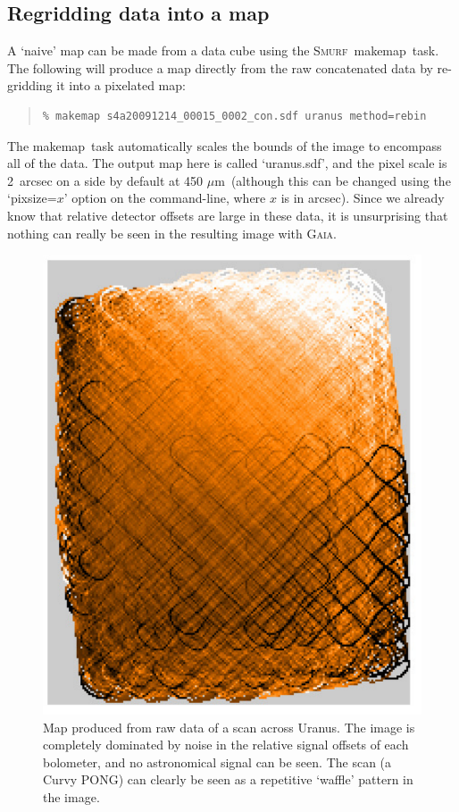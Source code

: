 \documentclass[twoside,11pt]{article}
\newcommand{\micron}{\mbox{\,${\mu}$m}}            %
\newcommand{\xref}[3]{#1}
\newcommand{\xlabel}[1]{}
\renewcommand{\_}{\texttt{\symbol{95}}}
\newenvironment{myquote}{\begin{quote}\begin{small}}{\end{small}\end{quote}}
\newcommand{\gaia}{\xref{\textsc{Gaia}}{sun214}{}}
\newcommand{\smurf}{\xref{\textsc{Smurf}}{sun258}{}}
\newcommand{\task}[1]{\textsf{#1}}
\newcommand{\makemap}{\xref{\task{makemap}}{sun258}{MAKEMAP}}
\begin{document}
\subsection{\xlabel{regrid_map}Regridding data into a map}

A `naive' map can be made from a data cube using the \smurf\ \makemap\
task. The following will produce a map directly from the raw
concatenated data by re-gridding it into a pixelated map:

\begin{myquote}
\begin{verbatim}
% makemap s4a20091214_00015_0002_con.sdf uranus method=rebin
\end{verbatim}
\end{myquote}

The \makemap\ task automatically scales the bounds of the image to
encompass all of the data. The output map here is called `uranus.sdf',
and the pixel scale is 2~arcsec on a side by default at 450\,\micron\
(although this can be changed using the `pixsize=$x$' option on the
command-line, where $x$ is in arcsec). Since we already know that
relative detector offsets are large in these data, it is unsurprising
that nothing can really be seen in the resulting image with \gaia.

\begin{figure}
\begin{center}
\includegraphics[width=0.5\linewidth]{sc19_rawmap}
\caption{Map produced from raw data of a scan across Uranus. The
  image is completely dominated by noise in the relative signal
  offsets of each bolometer, and no astronomical signal can be
  seen. The scan (a Curvy PONG) can clearly be seen as a repetitive
  `waffle' pattern in the image.}
\label{fig:rawmap}
\end{center}
\end{figure}
\end{document}
